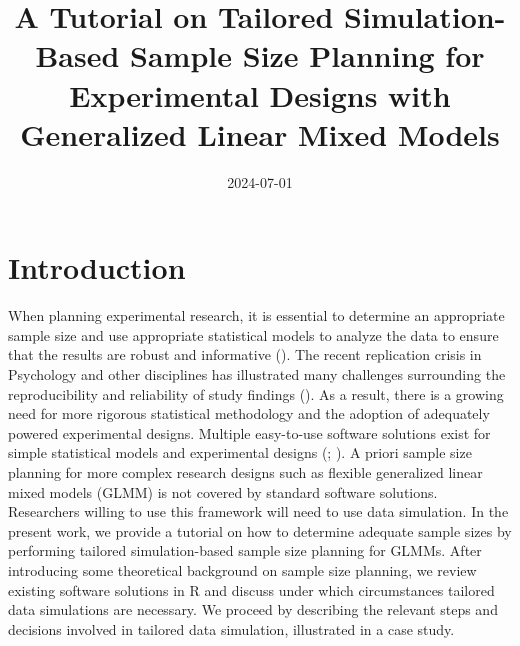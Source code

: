 \documentclass[
  man,
  floatsintext,
  longtable,
  a4paper,
  nolmodern,
  notxfonts,
  notimes,
  colorlinks=true,linkcolor=blue,citecolor=blue,urlcolor=blue]{apa7}
\title{A Tutorial on Tailored Simulation-Based Sample Size Planning for
Experimental Designs with Generalized Linear Mixed Models}
\date{2024-07-01}
\begin{document}
\maketitle


\setcounter{secnumdepth}{-\maxdimen} %

\setlength\LTleft{0pt}


\section{Introduction}\label{introduction}

When planning experimental research, it is essential to determine an
appropriate sample size and use appropriate statistical models to
analyze the data to ensure that the results are robust and informative
(). The
recent replication crisis in Psychology and other disciplines has
illustrated many challenges surrounding the reproducibility and
reliability of study findings
(). As a
result, there is a growing need for more rigorous statistical
methodology and the adoption of adequately powered experimental designs.
Multiple easy-to-use software solutions exist for simple statistical
models and experimental designs (;
). A priori sample size planning for more complex
research designs such as flexible generalized linear mixed models (GLMM)
is not covered by standard software solutions. Researchers willing to
use this framework will need to use data simulation. In the present
work, we provide a tutorial on how to determine adequate sample sizes by
performing tailored simulation-based sample size planning for GLMMs.
After introducing some theoretical background on sample size planning,
we review existing software solutions in R and discuss under which
circumstances tailored data simulations are necessary. We proceed by
describing the relevant steps and decisions involved in tailored data
simulation, illustrated in a case study.
\end{document}
